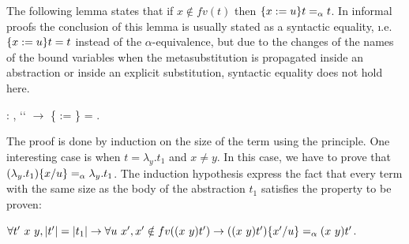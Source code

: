 The following lemma states that if $x \notin fv(t)$ then $\metasub{t}{x}{u} =_\alpha t$. In informal proofs the conclusion of this lemma is usually stated as a syntactic equality, {\i.e.} $\metasub{t}{x}{u} = t$ instead of the $\alpha$-equivalence, but due to the changes of the names of the bound variables when the metasubstitution is propagated inside an abstraction or inside an explicit substitution, syntactic equality does not hold here. 
\begin{coqdoccode}
\coqdocemptyline
\coqdocnoindent
{} : \coqdockw{\ensuremath{\forall}}   ,  ``   \ensuremath{\rightarrow} \{ := \} = .\coqdoceol
\end{coqdoccode}
 The proof is done by induction on the size of the term  using the  principle. One interesting case is when $t = \lambda_y.t_1$ and $x \neq y$. In this case, we have to prove that $(\lambda_y.t_1)\msub{x}{u} =_\alpha \lambda_y.t_1$. The induction hypothesis express the fact that every term with the same size as the body of the abstraction $t_1$ satisfies the property to be proven:


$\forall t'\ x\ y, |t'| = |t_1| \to \forall u\ x', x' \notin fv(\swap{x}{y}{t'}) \to (\swap{x}{y}{t'})\msub{x'}{u} =_\alpha \swap{x}{y}{t'}$.


